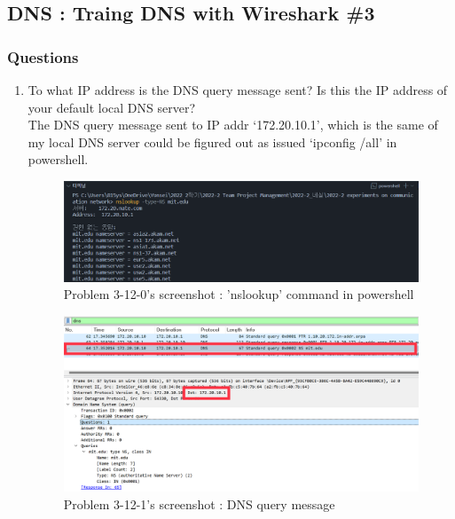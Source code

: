 \subsection{DNS : Traing DNS with Wireshark \#3}
    \subsubsection*{Questions}
    \begin{enumerate}[label=\bfseries Problem \arabic*:,leftmargin=*,labelindent=1em]\addtocounter{enumi}{11}
        \item To what IP address is the DNS query message sent? 
        Is this the IP address of your default local DNS server?\\[0.2mm]
            \soln The DNS query message sent to IP addr ‘172.20.10.1’, which is the same of my local DNS server could be figured out as issued ‘ipconfig /all’ in powershell.
            \vspace{-2mm}  
            \begin{figure}[!h]\centering
        		\includegraphics[width=.78\textwidth]{image/result_week01/Q3-c-0.png}
        		\caption{\footnotesize Problem 3-12-0's screenshot : 'nslookup' command in powershell}
        		\vspace{-10pt}
            \end{figure}
            \begin{figure}[!h]\centering
        		\includegraphics[width=.79\textwidth]{image/result_week01/Q3-c-1.png}
        		\caption{\footnotesize Problem 3-12-1's screenshot : DNS query message}
        		\vspace{-10pt}

\end{figure}
\end{enumerate}

